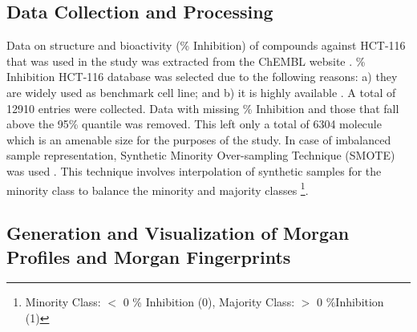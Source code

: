 \setlength{\parindent}{0pt}

\subsection*{Data Collection and Processing}
Data on structure and bioactivity (\% Inhibition) of compounds against HCT-116 that was used in the study was extracted from the ChEMBL website \cite{ChEMBL2023}. \% Inhibition HCT-116 database was selected due to the following reasons: a) they are widely used as benchmark cell line; and b) it is highly available \cite{Cytion_HCT116}. 
A total of 12910 entries were collected. Data with missing \% Inhibition and those that fall above the 95\% quantile was removed. This left only a total of 6304 molecule which is an amenable size for the purposes of the study. In case of imbalanced sample representation, Synthetic Minority Over-sampling Technique (SMOTE) was used \cite{gomatam2024SMOTE}. This technique involves interpolation of synthetic samples for the minority class to balance the minority and majority classes \footnote{Minority Class: $<$ 0 \% Inhibition (0), Majority Class: $>$ 0 \%Inhibition (1)}.   



\subsection*{Generation and Visualization of Morgan Profiles and Morgan Fingerprints}

